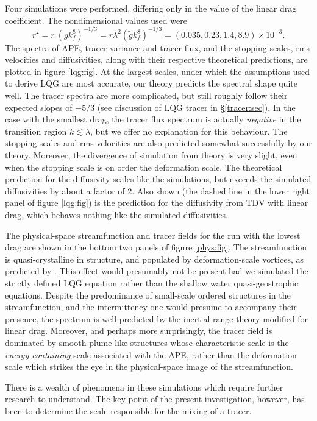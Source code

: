 \documentclass{jfm}
\begin{document}
Four simulations were performed, differing only in the value of the
linear drag coefficient.  The nondimensional values used were
\[
r^{\star}
= r~\left(gk_f^8\right)^{-1/3}
= r\lambda^2\left(\tilde{g}k_f^8\right)^{-1/3}
=(0.035, 0.23, 1.4, 8.9)\times 10^{-3}.
\]
The spectra of APE, tracer variance and tracer flux, and the
stopping scales, rms velocities and diffusivities, along with
their respective theoretical predictions, are plotted in figure
\ref{lqg:fig}.  At the largest scales, under which the
assumptions used to derive LQG are most accurate, our theory
predicts the spectral shape quite well.  The tracer spectra are
more complicated, but still roughly follow their expected slopes
of $-5/3$ (see discussion of LQG tracer in \S \ref{tracer:sec}).
In the case with the smallest drag, the tracer flux spectrum is
actually \textit{negative} in the transition region $k \lesssim
\lambda$, but we offer no explanation for this behaviour. The
stopping scales and rms velocities are also predicted somewhat
successfully by our theory.  Moreover, the divergence of
simulation from theory is very slight, even when the stopping
scale is on order the deformation scale. The theoretical
prediction for the diffusivity scales like the simulations, but
exceeds the simulated diffusivities by about a factor of 2. Also
shown (the dashed line in the lower right panel of figure
\ref{lqg:fig}) is the prediction for the diffusivity from TDV
with linear drag, which behaves nothing like the simulated
diffusivities.

The physical-space streamfunction and tracer fields for the run with
the lowest drag are shown in the bottom two panels of figure
\ref{phys:fig}.  The streamfunction is quasi-crystalline in structure,
and populated by deformation-scale vortices, as predicted by
\citet{kukharkin95}.  This effect would presumably not be present had
we simulated the strictly defined LQG equation rather than the shallow
water quasi-geostrophic equations.  Despite the predominance of
small-scale ordered structures in the streamfunction, and the
intermittency one would presume to accompany their presence, the
spectrum is well-predicted by the inertial range theory modified for
linear drag.  Moreover, and perhaps more surprisingly, the tracer
field is dominated by smooth plume-like structures whose
characteristic scale is the \textit{energy-containing} scale
associated with the APE, rather than the deformation scale which
strikes the eye in the physical-space image of the streamfunction.

There is a wealth of phenomena in these simulations which require
further research to understand.  The key point of the present
investigation, however, has been to determine the scale responsible
for the mixing of a tracer.
\end{document}
